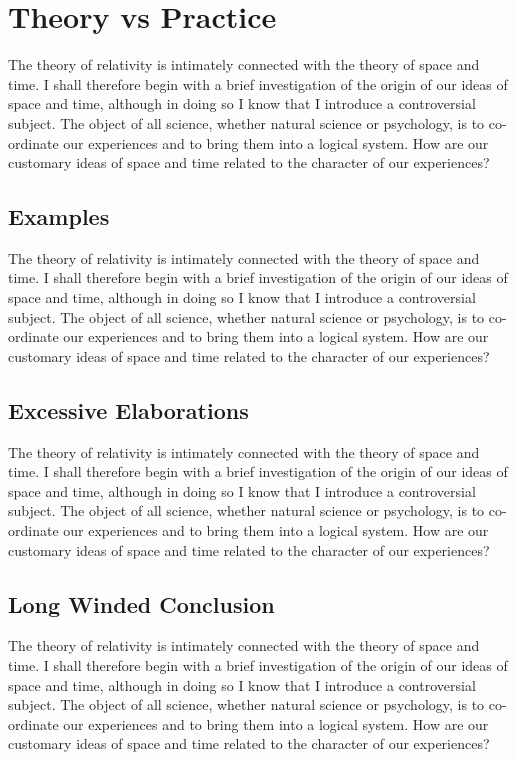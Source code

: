 \documentclass{book}
\begin{document}
\section{Theory vs Practice}

The theory of relativity is intimately connected
with the theory of space and time. I shall therefore begin with a brief
investigation of the origin of our ideas of space and time, although in
doing so I know that I introduce a controversial subject. The object of all
science, whether natural science or psychology, is to co-ordinate our
experiences and to bring them into a logical system. How are our customary
ideas of space and time related to the character of our experiences?

\subsection{Examples}

The theory of relativity is intimately connected
with the theory of space and time. I shall therefore begin with a brief
investigation of the origin of our ideas of space and time, although in
doing so I know that I introduce a controversial subject. The object of all
science, whether natural science or psychology, is to co-ordinate our
experiences and to bring them into a logical system. How are our customary
ideas of space and time related to the character of our experiences?

\subsection{Excessive Elaborations}

The theory of relativity is intimately connected
with the theory of space and time. I shall therefore begin with a brief
investigation of the origin of our ideas of space and time, although in
doing so I know that I introduce a controversial subject. The object of all
science, whether natural science or psychology, is to co-ordinate our
experiences and to bring them into a logical system. How are our customary
ideas of space and time related to the character of our experiences?

\subsection{Long Winded Conclusion}

The theory of relativity is intimately connected
with the theory of space and time. I shall therefore begin with a brief
investigation of the origin of our ideas of space and time, although in
doing so I know that I introduce a controversial subject. The object of all
science, whether natural science or psychology, is to co-ordinate our
experiences and to bring them into a logical system. How are our customary
ideas of space and time related to the character of our experiences?
\end{document}
